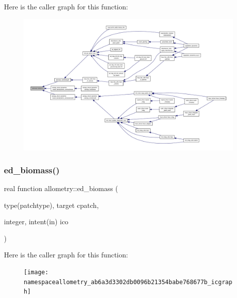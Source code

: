 Here is the caller graph for this function\+:
\nopagebreak
\begin{figure}[H]
\begin{center}
\leavevmode
\includegraphics[width=350pt]{namespaceallometry_aab2b2cee61cac31529246b043121c7de_icgraph}
\end{center}
\end{figure}
\mbox{\label{namespaceallometry_ab6a3d3302db0096b21354babe768677b}} 
\subsubsection{\texorpdfstring{ed\+\_\+biomass()}{ed\_biomass()}}
{\footnotesize\ttfamily real function allometry\+::ed\+\_\+biomass (\begin{DoxyParamCaption}\item[{type(patchtype), target}]{cpatch,  }\item[{integer, intent(in)}]{ico }\end{DoxyParamCaption})}

Here is the caller graph for this function\+:
\nopagebreak
\begin{figure}[H]
\begin{center}
\leavevmode
\texttt{[image: namespaceallometry\_ab6a3d3302db0096b21354babe768677b\_icgraph]}
\end{center}
\end{figure}
\mbox{\label{namespaceallometry_a88949ed487fccc2f1dfd065399043b0d}} 
